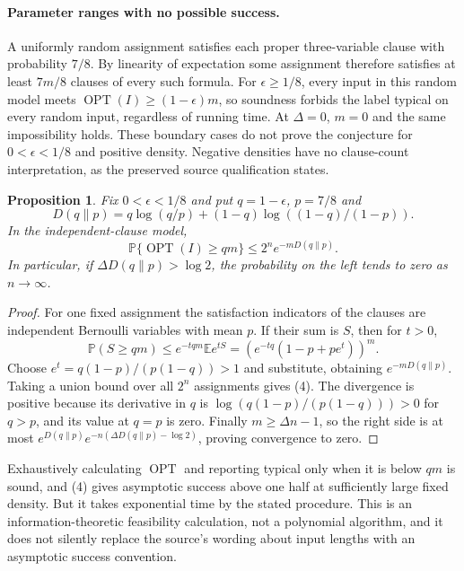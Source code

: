 \documentclass[11pt]{article}
\newtheorem{proposition}{Proposition}
\begin{document}
\paragraph{Parameter ranges with no possible success.}
A uniformly random assignment satisfies each proper three-variable clause with probability $7/8$. By linearity of expectation some assignment therefore satisfies at least $7m/8$ clauses of every such formula. For $\epsilon\ge1/8$, every input in this random model meets $\operatorname{OPT}(I)\ge(1-\epsilon)m$, so soundness forbids the label typical on every random input, regardless of running time. At $\Delta=0$, $m=0$ and the same impossibility holds. These boundary cases do not prove the conjecture for $0<\epsilon<1/8$ and positive density. Negative densities have no clause-count interpretation, as the preserved source qualification states.

\begin{proposition}
Fix $0<\epsilon<1/8$ and put $q=1-\epsilon$, $p=7/8$ and
\[
 D(q\|p)=q\log(q/p)+(1-q)\log((1-q)/(1-p)).
\]
In the independent-clause model,
\[
 \mathbb P\{\operatorname{OPT}(I)\ge qm\}\le2^n e^{-mD(q\|p)}. \tag{4}
\]
In particular, if $\Delta D(q\|p)>\log2$, the probability on the left tends to zero as $n\to\infty$.
\end{proposition}
\begin{proof}
For one fixed assignment the satisfaction indicators of the clauses are independent Bernoulli variables with mean $p$. If their sum is $S$, then for $t>0$,
\[
 \mathbb P(S\ge qm)\le e^{-tqm}\mathbb Ee^{tS}
 =\left(e^{-tq}(1-p+pe^t)\right)^m.
\]
Choose $e^t=q(1-p)/(p(1-q))>1$ and substitute, obtaining $e^{-mD(q\|p)}$. Taking a union bound over all $2^n$ assignments gives (4). The divergence is positive because its derivative in $q$ is $\log(q(1-p)/(p(1-q)))>0$ for $q>p$, and its value at $q=p$ is zero. Finally $m\ge\Delta n-1$, so the right side is at most $e^{D(q\|p)}e^{-n(\Delta D(q\|p)-\log2)}$, proving convergence to zero.
\end{proof}

Exhaustively calculating $\operatorname{OPT}$ and reporting typical only when it is below $qm$ is sound, and (4) gives asymptotic success above one half at sufficiently large fixed density. But it takes exponential time by the stated procedure. This is an information-theoretic feasibility calculation, not a polynomial algorithm, and it does not silently replace the source's wording about input lengths with an asymptotic success convention.
\end{document}

